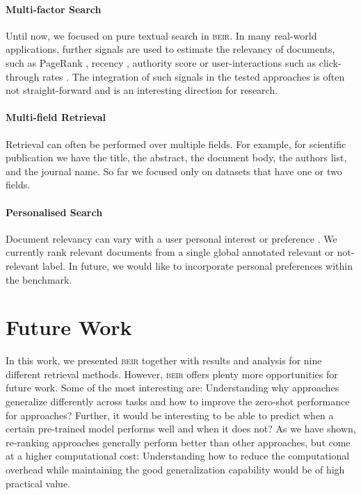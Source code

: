 \documentclass[11pt]{article}
\newcommand{\custo}[1]{\textsc{\normalsize #1}}
\newcommand{\beir}{\custo{beir}\xspace}
\begin{document}
\paragraph{Multi-factor Search} Until now, we focused on pure textual search in \beir. In many real-world applications, further signals are used to estimate the relevancy of documents, such as PageRank \cite{ilprints422}, recency \cite{10.1145/1772690.1772725}, authority score \cite{10.1145/324133.324140} or user-interactions such as click-through rates \cite{10.1145/1458082.1458092}. The integration of such signals in the tested approaches is often not straight-forward and is an interesting direction for research.

\paragraph{Multi-field Retrieval} Retrieval can often be performed over multiple fields. For example, for scientific publication we have the title, the abstract, the document body, the authors list, and the journal name. So far we focused only on datasets that have one or two fields.

\paragraph{Personalised Search} Document relevancy can vary with a user personal interest or preference \cite{ghorab2013personalised}. We currently rank relevant documents from a single global annotated relevant or not-relevant label. In future, we would like to incorporate personal preferences within the benchmark.

\section{Future Work}

In this work, we presented \beir together with results and analysis for nine different retrieval methods. However, \beir offers plenty more opportunities for future work. Some of the most interesting are: Understanding why approaches generalize differently across tasks and how to improve the zero-shot performance for approaches? Further, it would be interesting to be able to predict when a certain pre-trained model performs well and when it does not? As we have shown, re-ranking approaches generally perform better than other approaches, but come at a higher computational cost: Understanding how to reduce the computational overhead while maintaining the good generalization capability would be of high practical value.
\end{document}
